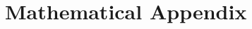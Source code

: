 \documentclass[AEJ,reqno, draftmode]{AEA}
\begin{document}




\appendix
\section{Mathematical Appendix}
\end{document}
